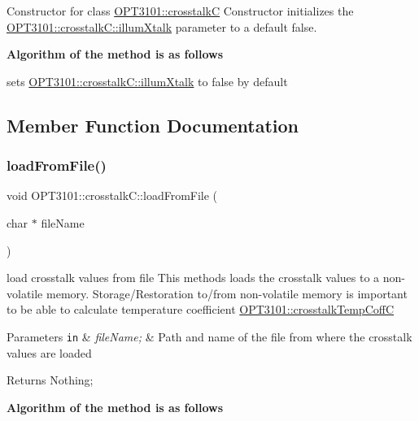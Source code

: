 Constructor for class \mbox{\hyperlink{class_o_p_t3101_1_1crosstalk_c}{O\+P\+T3101\+::crosstalkC}} Constructor initializes the \mbox{\hyperlink{class_o_p_t3101_1_1crosstalk_c_a74d3bfbfb7da65511d2d16e1b66a7098}{O\+P\+T3101\+::crosstalk\+C\+::illum\+Xtalk}} parameter to a default false. 

{\bfseries Algorithm of the method is as follows}


\begin{DoxyItemize}
\item sets \mbox{\hyperlink{class_o_p_t3101_1_1crosstalk_c_a74d3bfbfb7da65511d2d16e1b66a7098}{O\+P\+T3101\+::crosstalk\+C\+::illum\+Xtalk}} to false by default 
\end{DoxyItemize}

\subsection{Member Function Documentation}
\mbox{\label{class_o_p_t3101_1_1crosstalk_c_a8927a7e31870bf41a64d8b1755c6b0b2}} 
\subsubsection{\texorpdfstring{load\+From\+File()}{loadFromFile()}}
{\footnotesize\ttfamily void O\+P\+T3101\+::crosstalk\+C\+::load\+From\+File (\begin{DoxyParamCaption}\item[{char $\ast$}]{file\+Name }\end{DoxyParamCaption})}



load crosstalk values from file This methods loads the crosstalk values to a non-\/volatile memory. Storage/\+Restoration to/from non-\/volatile memory is important to be able to calculate temperature coefficient \mbox{\hyperlink{class_o_p_t3101_1_1crosstalk_temp_coff_c}{O\+P\+T3101\+::crosstalk\+Temp\+CoffC}} 


\begin{DoxyParams}[1]{Parameters}
\mbox{\tt in}  & {\em file\+Name;} & Path and name of the file from where the crosstalk values are loaded \\
\hline
\end{DoxyParams}
\begin{DoxyReturn}{Returns}
Nothing; 
\end{DoxyReturn}
{\bfseries Algorithm of the method is as follows}


